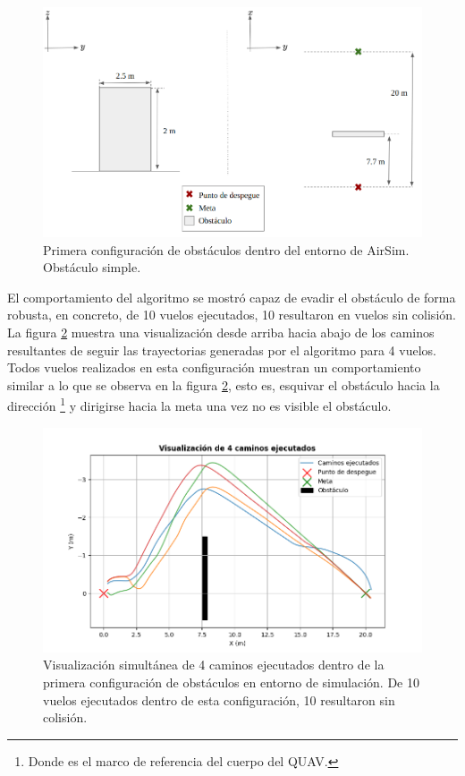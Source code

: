 \begin{figure}[H]
    \centering
    \includegraphics[scale=0.35]{partes/img/config-1-single.png}
    \caption[Primera configuración de obstáculos dentro del entorno de AirSim.]{Primera configuración de obstáculos dentro del entorno de AirSim. Obstáculo simple.}
    \label{fig:config-1-single}
\end{figure}

El comportamiento del algoritmo se mostró capaz de evadir el obstáculo de forma robusta, en concreto, de 10 vuelos ejecutados, 10 resultaron en vuelos sin colisión. La figura \ref{fig:single-graph-4} muestra una visualización desde arriba hacia abajo de los caminos resultantes de seguir las trayectorias generadas por el algoritmo para 4 vuelos. Todos vuelos realizados en esta configuración muestran un comportamiento similar a lo que se observa en la figura \ref{fig:single-graph-4}, esto es, esquivar el obstáculo hacia la dirección \footnote[1]{Donde  es el marco de referencia del cuerpo del QUAV.} y dirigirse hacia la meta una vez no es visible el obstáculo.

\begin{figure}[H]
    \centering
    \includegraphics[scale=0.65]{partes/img/sim-single-panel-graph-4.png}
    \caption[Visualización simultánea de 4 caminos ejecutados dentro de la primera configuración de obstáculos en entorno de simulación.]{Visualización simultánea de 4 caminos ejecutados dentro de la primera configuración de obstáculos en entorno de simulación. De 10 vuelos ejecutados dentro de esta configuración, 10 resultaron sin colisión.}
    \label{fig:single-graph-4}
\end{figure}

